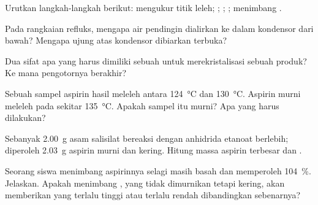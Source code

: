 \begin{exercise}[$\star$]\label{exo:g10:synthesis-yield:2}
Urutkan langkah-langkah  berikut: mengukur titik leleh;
; ;  ; menimbang .
\end{exercise}

\begin{exercise}[$\star$]\label{exo:g10:synthesis-yield:3}
Pada rangkaian refluks, mengapa air pendingin dialirkan ke dalam
kondensor dari bawah? Mengapa ujung atas kondensor dibiarkan terbuka?
\end{exercise}

\begin{exercise}[$\star$]\label{exo:g10:synthesis-yield:4}
Dua sifat apa yang harus dimiliki sebuah  untuk merekristalisasi
sebuah produk? Ke mana pengotornya berakhir?
\end{exercise}

\begin{exercise}[$\star$]\label{exo:g10:synthesis-yield:5}
Sebuah sampel aspirin hasil  meleleh antara \qty{124}{\celsius}
dan \qty{130}{\celsius}. Aspirin murni meleleh pada sekitar
\qty{135}{\celsius}. Apakah sampel itu murni? Apa yang harus dilakukan?
\end{exercise}

\begin{exercise}[$\star\star$]\label{exo:g10:synthesis-yield:6}
Sebanyak \qty{2.00}{g} asam salisilat bereaksi dengan anhidrida etanoat
berlebih; diperoleh \qty{2.03}{g} aspirin murni dan kering. Hitung
massa aspirin terbesar dan .
\end{exercise}

\begin{exercise}[$\star\star$]\label{exo:g10:synthesis-yield:7}
Seorang siswa menimbang aspirinnya selagi masih basah dan memperoleh
 \qty{104}{\percent}. Jelaskan. Apakah menimbang ,
yang tidak dimurnikan tetapi kering, akan memberikan  yang
terlalu tinggi atau terlalu rendah dibandingkan  sebenarnya?
\end{exercise}

